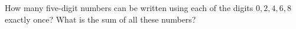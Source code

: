 How many five-digit numbers can be written using each of the digits $0,2,4,6,8$ exactly once? What is the sum of all these numbers?
